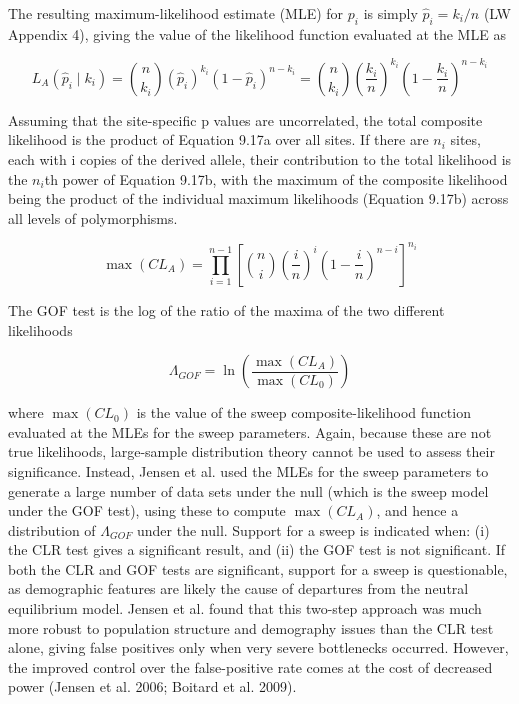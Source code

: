 \documentclass{article}
\begin{document}
The resulting maximum-likelihood estimate (MLE) for  $ p_i $ is simply  $ \widehat{p}_i = k_i / n $ (LW Appendix 4), giving the value of the likelihood function evaluated at the MLE as

\begin{equation}
L_{A}(\widehat{p}_{i}\mid k_{i})=\binom{n}{k_{i}}(\widehat{p}_{i})^{k_{i}}(1-\widehat{p}_{i})^{n-k_{i}}=\binom{n}{k_{i}}\left(\frac{k_{i}}{n}\right)^{k_{i}}\left(1-\frac{k_{i}}{n}\right)^{n-k_{i}}
\tag{9.17b}
\label{eq:9_17b}
\end{equation}

Assuming that the site-specific p values are uncorrelated, the total composite likelihood is the product of Equation 9.17a over all sites. If there are  $ n_i $ sites, each with i copies of the derived allele, their contribution to the total likelihood is the  $ n_i $th power of Equation 9.17b, with the maximum of the composite likelihood being the product of the individual maximum likelihoods (Equation 9.17b) across all levels of polymorphisms.

\begin{equation}
\max\left(CL_{A}\right)=\prod_{i=1}^{n-1}\left[\binom{n}{i}\left(\frac{i}{n}\right)^{i}\left(1-\frac{i}{n}\right)^{n-i}\right]^{n_{i}}
\tag{9.17c}
\label{eq:9_17c}
\end{equation}

The GOF test is the log of the ratio of the maxima of the two different likelihoods

\begin{equation}
\Lambda_{GOF}=\ln\left(\frac{\max\left(CL_{A}\right)}{\max\left(CL_{0}\right)}\right)
\tag{9.17d}
\label{eq:9_17d}
\end{equation}

where  $ \max(CL_0) $ is the value of the sweep composite-likelihood function evaluated at the MLEs for the sweep parameters. Again, because these are not true likelihoods, large-sample distribution theory cannot be used to assess their significance. Instead, Jensen et al. used the MLEs for the sweep parameters to generate a large number of data sets under the null (which is the sweep model under the GOF test), using these to compute  $ \max(CL_A) $, and hence a distribution of  $ \Lambda_{GOF} $ under the null. Support for a sweep is indicated when: (i) the CLR test gives a significant result, and (ii) the GOF test is not significant. If both the CLR and GOF tests are significant, support for a sweep is questionable, as demographic features are likely the cause of departures from the neutral equilibrium model. Jensen et al. found that this two-step approach was much more robust to population structure and demography issues than the CLR test alone, giving false positives only when very severe bottlenecks occurred. However, the improved control over the false-positive rate comes at the cost of decreased power (Jensen et al. 2006; Boitard et al. 2009).
\end{document}
